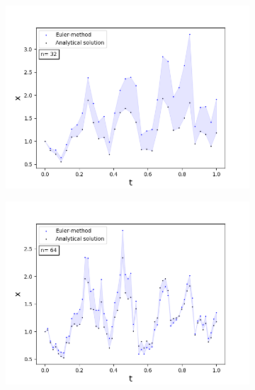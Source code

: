 \begin{figure}[!h]
\centering
   \begin{subfigure}{0.49\linewidth} \centering
     \includegraphics[scale=0.4]{Content/Graphics/Appendix/1gbm3}
   \end{subfigure}
   \begin{subfigure}{0.49\linewidth} \centering
     \includegraphics[scale=0.4]{Content/Graphics/Appendix/4gbm3}
   \end{subfigure}
   \begin{subfigure}{0.49\linewidth} \centering

\end{subfigure}
\end{figure}
